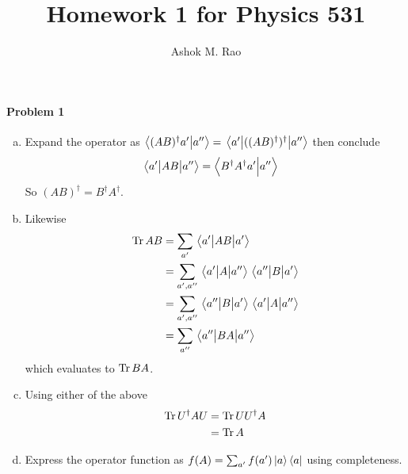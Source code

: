 \documentclass[10pt]{scrartcl}
\title{Homework 1 for Physics  531}
\author{Ashok M. Rao}
\begin{document}
\maketitle
{}

\paragraph{Problem 1}
\begin{enumerate}[(a)]
\item Expand the operator as $\bra{(AB)^{\dagger}a'}\ket{a''}=\mel{a'}{((AB)^{\dagger})^{\dagger}}{a''}$ then conclude
\begin{align*}
	\mel{a'}{AB}{a''}&= \braket{B^\dagger A^\dagger a'}{a''}
\end{align*}
So $(AB)^\dagger = B^\dagger A^\dagger$. 
\item Likewise
\begin{align*}
\Trace{AB} &=\sum_{a'}\mel{a'}{AB}{a'} \\
&= \sum_{a', a''}\mel{a'}{A}{a''}\mel{a''}{B}{a'}\\
&= 	\sum_{a', a''}\mel{a''}{B}{a'}\mel{a'}{A}{a''}\\
&=\sum_{a''}\mel{a''}{BA}{a''}
\end{align*}
which evaluates to $\operatorname{Tr}{BA}$.
\item Using either of the above
\begin{align*}
	\operatorname{Tr}{U^{\dagger} A U} &= \operatorname{Tr}{U U^\dagger A} \\
	&= \operatorname{Tr}{A}
\end{align*}
\item Express the operator function as $f(A) = \sum_{a'} f(a')\ket{a}\bra{a}$ using completeness.
\end{enumerate}
\end{document}
